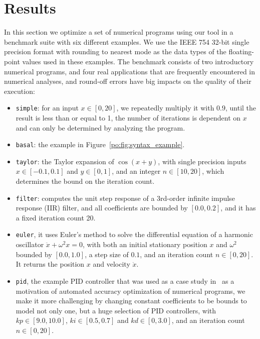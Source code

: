 \section{Results}
\label{po:sec:results}

In this section we optimize a set of numerical programs using our tool in
a benchmark suite with six different examples.  We use the IEEE 754 32-bit
single precision format with rounding to nearest mode as the data types of the
floating-point values used in these examples.  The benchmark consists of two
introductory numerical programs, and four real applications that are frequently
encountered in numerical analyses, and round-off errors have big impacts on the
quality of their execution:
\begin{itemize}
    \item \texttt{simple}: for an input $x \in [0, 20]$, we repeatedly multiply
it with $0.9$, until the result is less than or equal to 1, the number of
iterations is dependent on $x$ and can only be determined by analyzing the
program.
    \item \texttt{basal}: the example in Figure~\ref{po:fig:syntax_example}.
    \item \texttt{taylor}: the Taylor expansion of $\cos(x + y)$, with single
precision inputs $x \in [-0.1, 0.1]$ and $y \in [0, 1]$, and an integer $n \in
[10, 20]$, which determines the bound on the iteration count.
    \item \texttt{filter}: computes the unit step response of a 3rd-order
infinite impulse response (IIR) filter, and all coefficients are bounded by
$[0.0, 0.2]$, and it has a fixed iteration count 20.
    \item \texttt{euler}, it uses Euler's method to solve the differential
equation of a harmonic oscillator $\ddot{x} + \omega^2 x = 0$, with both an
initial stationary position $x$ and $\omega^2$ bounded by $[0.0, 1.0]$, a step
size of $0.1$, and an iteration count $n \in [0, 20]$.  It returns the position
$x$ and velocity $\dot{x}$.
    \item \texttt{pid}, the example PID controller that was used as a case
study in~\cite{damouche14} as a motivation of automated accuracy optimization
of numerical programs, we make it more challenging by changing constant
coefficients to be bounds to model not only one, but a huge selection of PID
controllers, with $kp \in [9.0, 10.0]$, $ki \in [0.5, 0.7]$ and $kd \in [0,
3.0]$, and an iteration count $n \in [0, 20]$.
\end{itemize}


